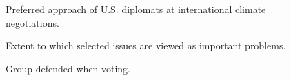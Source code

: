 \begin{figure}[h!]
    \caption{Preferred approach of U.S. diplomats at international climate negotiations.}\label{fig:negotiation}
\end{figure}


\begin{figure}[h!]
    \caption{Extent to which selected issues are viewed as important problems.}\label{fig:problem}
\end{figure}

\begin{figure}[h!]
    \caption{Group defended when voting.}\label{fig:group_defended_agg}
\end{figure}


